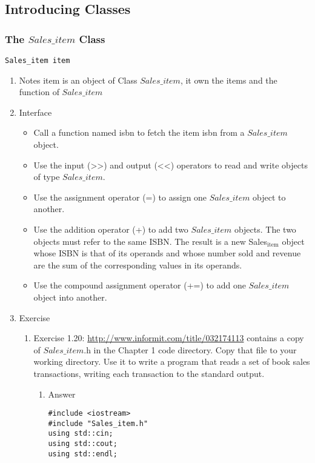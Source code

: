 \documentclass[11pt]{article}
\begin{document}
\subsection{Introducing Classes}
\label{sec-1-5}
\subsubsection{The $Sales\_item$ Class}
\label{sec-1-5-1}
\begin{verbatim}
Sales_item item
\end{verbatim}
\begin{enumerate}
\item Notes
\label{sec-1-5-1-1}
item is an object of Class $Sales\_item$, it own the items and the function of $Sales\_item$
\item Interface
\label{sec-1-5-1-2}
\begin{itemize}
\item Call a function named isbn to fetch the item isbn from a $Sales\_item$ object.
\item Use the input (>>) and output (<<) operators to read and write objects of type $Sales\_item$.
\item Use the assignment operator (=) to assign one $Sales\_item$ object to another.
\item Use the addition operator (+) to add two $Sales\_item$ objects. The two objects must refer to the same ISBN. The result is a new Sales$_{\text{item}}$ object whose ISBN is that of its operands and whose number sold and revenue are the sum of the corresponding values in its operands.
\item Use the compound assignment operator (+=) to add one $Sales\_item$ object into another.
\end{itemize}
\item Exercise
\label{sec-1-5-1-3}
\begin{enumerate}
\item Exercise 1.20: \url{http://www.informit.com/title/032174113} contains a copy of $Sales\_item$.h in the Chapter 1 code directory. Copy that file to your working directory. Use it to write a program that reads a set of book sales transactions, writing each transaction to the standard output.
\label{sec-1-5-1-3-1}
\begin{enumerate}
\item Answer
\label{sec-1-5-1-3-1-1}
\begin{verbatim}
#include <iostream>
#include "Sales_item.h"
using std::cin;
using std::cout;
using std::endl;


\end{verbatim}
\end{enumerate}
\end{enumerate}
\end{enumerate}
\end{document}
